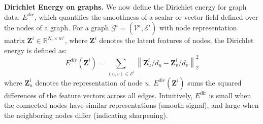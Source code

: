 \textbf{Dirichlet Energy on graphs.} 
We now define the Dirichlet energy for graph data: \( E^{dir} \), which quantifies the smoothness of a scalar or vector field defined over the nodes of a graph. For a graph \( \mathcal{G}^i = (\mathcal{V}^i, \mathcal{E}^i) \) with node representation matrix \( \mathbf{Z}^i \in \mathbb{R}^{N_i \times m'} \), where \( \mathbf{Z}^i \) denotes the latent features of nodes, the Dirichlet energy is defined as:
\begin{equation}
E^{dir}(\mathbf{Z}^i) = \sum_{(u,v) \in \mathcal{E}^i} \left\| \mathbf{Z}^i_{u}/d_u - \mathbf{Z}^i_{v}/d_v \right\|_2^2
\label{eq:edir-edge}
\end{equation}
where \( \mathbf{Z}^i_{u}\) denotes the representation of node $u$. $E^{dir}(\mathbf{Z}^i)$ sums the squared differences of the feature vectors across all edges. Intuitively, \( E^{\text{dir}} \) is small when the connected nodes have similar representations (smooth signal), and large when the neighboring nodes differ (indicating sharpening).


 


